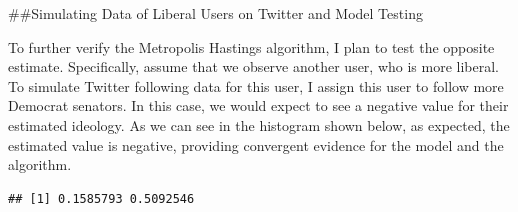 \documentclass[]{book}
\newenvironment{Shaded}{\begin{snugshade}}{\end{snugshade}}
\newcommand{\CommentTok}[1]{\textcolor[rgb]{0.56,0.35,0.01}{\textit{#1}}}
\newcommand{\DataTypeTok}[1]{\textcolor[rgb]{0.13,0.29,0.53}{#1}}
\newcommand{\DecValTok}[1]{\textcolor[rgb]{0.00,0.00,0.81}{#1}}
\newcommand{\KeywordTok}[1]{\textcolor[rgb]{0.13,0.29,0.53}{\textbf{#1}}}
\newcommand{\NormalTok}[1]{#1}
\newcommand{\OperatorTok}[1]{\textcolor[rgb]{0.81,0.36,0.00}{\textbf{#1}}}
\newcommand{\StringTok}[1]{\textcolor[rgb]{0.31,0.60,0.02}{#1}}
\begin{document}
\#\#Simulating Data of Liberal Users on Twitter and Model Testing

To further verify the Metropolis Hastings algorithm, I plan to test the opposite estimate. Specifically, assume that we observe another user, who is more liberal. To simulate Twitter following data for this user, I assign this user to follow more Democrat senators. In this case, we would expect to see a negative value for their estimated ideology. As we can see in the histogram shown below, as expected, the estimated value is negative, providing convergent evidence for the model and the algorithm.

\begin{Shaded}
\end{Shaded}

\begin{verbatim}
## [1] 0.1585793 0.5092546
\end{verbatim}

\begin{Shaded}
\end{Shaded}
\end{document}
